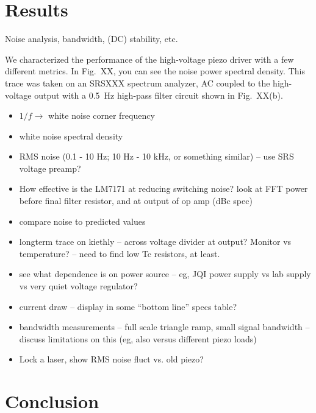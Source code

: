 \documentclass[aip,rsi,reprint]{revtex4-1} %
\begin{document}
\section{Results}
\label{Sec:Results}
Noise analysis, bandwidth, (DC) stability, etc.

We characterized the performance of the high-voltage piezo driver with a few different metrics.
In Fig.~XX, you can see the noise power spectral density.
This trace was taken on an SRSXXX spectrum analyzer, AC coupled to the high-voltage output with a \SI{0.5}{\hertz} high-pass filter circuit shown in Fig.~XX(b).

\begin{itemize}
\item $1/f \rightarrow$ white noise corner frequency
\item white noise spectral density
\item RMS noise (0.1 - 10 Hz; 10 Hz - 10 kHz, or something similar) -- use SRS voltage preamp?
\item How effective is the LM7171 at reducing switching noise? look at FFT power before final filter resistor, and at output of op amp (dBc spec)
\item compare noise to predicted values
\item longterm trace on kiethly -- across voltage divider at output? Monitor vs temperature? -- need to find low Tc resistors, at least.
\item see what dependence is on power source -- eg, JQI power supply vs lab supply vs very quiet voltage regulator?
\item current draw -- display in some ``bottom line'' specs table?
\item bandwidth measurements -- full scale triangle ramp, small signal bandwidth -- discuss limitations on this (eg, also versus different piezo loads)
\item Lock a laser, show RMS noise fluct vs. old piezo?
\end{itemize}

\section{Conclusion}
\label{Sec:Conclusion}


\end{document}

